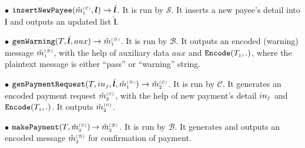 \begin{definition}
\vs

\item [$\bullet$] $\mathtt{insertNewPayee}(\hat{m}^{\scriptscriptstyle\mathcal{(C)}}_{\scriptscriptstyle 1}, {\bm l})\rightarrow  \hat{\bm l}$. 
It is run by $\mathcal{S}$. It inserts a new payee's detail into ${\bm l}$ and outputs an updated list $\hat{\bm l}$.
%

\vs

\item  [$\bullet$] $\mathtt{genWarning}(T, \hat{\bm l}, {aux})\rightarrow \hat m^{\scriptscriptstyle\mathcal{(B)}}_{\scriptscriptstyle1}$. It is run by $\mathcal{B}$. It outputs an encoded (warning) message $\hat m^{\scriptscriptstyle\mathcal{(B)}}_{\scriptscriptstyle1}$, with the help of auxiliary data ${aux}$ and $\mathtt{Encode}(T_{\scriptscriptstyle 1},.)$, where the plaintext message is either ``pass'' or ``warning'' string. 
%

\vs

\item  [$\bullet$] $\mathtt{genPaymentRequest}(T, in_{\scriptscriptstyle f}, \hat{\bm{l}}, \hat m^{\scriptscriptstyle\mathcal{(B)}}_{\scriptscriptstyle1})\rightarrow \hat m^{\scriptscriptstyle\mathcal{(C)}}_{\scriptscriptstyle2}$. It is  run by $\mathcal{C}$. It generates an encoded payment request  $\hat m^{\scriptscriptstyle\mathcal{(C)}}_{\scriptscriptstyle2}$, with the help of new payment's detail $in_{\scriptscriptstyle f}$ and $\mathtt{Encode}(T_{\scriptscriptstyle 1},.)$. It outputs  $\hat m^{\scriptscriptstyle\mathcal{(C)}}_{\scriptscriptstyle2}$.  
%

\vs

\item  [$\bullet$] $\mathtt{makePayment}(T, \hat m^{\scriptscriptstyle\mathcal{(C)}}_{\scriptscriptstyle2})\hspace{-.5mm}\rightarrow \hat m^{\scriptscriptstyle\mathcal{(B)}}_{\scriptscriptstyle2}$. It is run by $\mathcal{B}$. It  generates and outputs an encoded message $\hat m^{\scriptscriptstyle\mathcal{(B)}}_{\scriptscriptstyle2}$ for confirmation of payment. 
%


 
 
 \vs
 

\end{definition}
